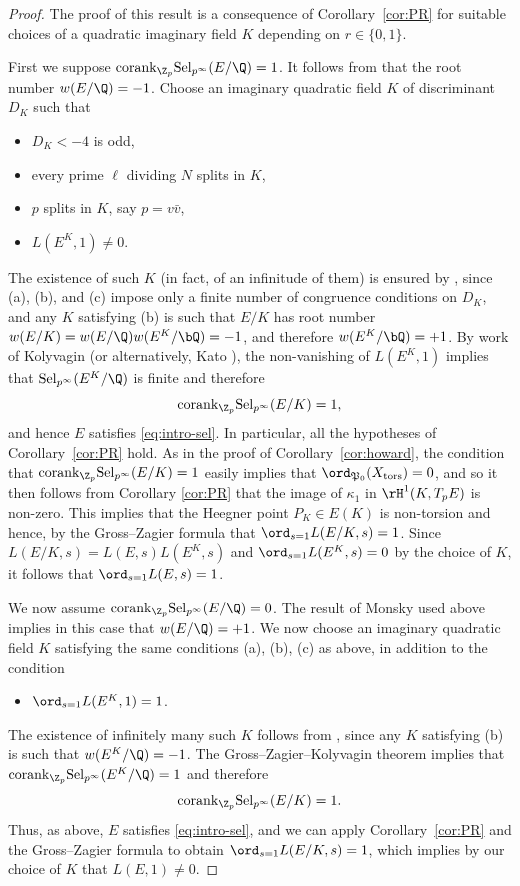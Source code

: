 \begin{proof}
The proof of this result is a consequence of Corollary~\ref{cor:PR} for suitable choices of a quadratic imaginary field $K$ depending on $r\in\{0,1\}$.

First we suppose ${\rm corank}_{\Z_p}{\rm Sel}_{p^\infty}(E/\Q) = 1$. It follows from \cite[Theorem 1.5]{monsky} that the root number $w(E/\Q)=-1$.  Choose an imaginary quadratic field $K$ of discriminant $D_K$ such that
\begin{itemize}
\item[(a)] $D_K<-4$ is odd,
\item[(b)] every prime $\ell$ dividing $N$ splits in $K$,
\item[(c)] $p$ splits in $K$, say $p=v\bar{v}$,
\item[(d)] $L(E^K,1)\neq 0$.
\end{itemize}
The existence of such $K$ (in fact, of an infinitude of them) is ensured by \cite[Thm.~B.1]{twist}, since (a), (b), and (c) impose only a finite number of congruence conditions on $D_K$, and any $K$ satisfying (b) is such that $E/K$ has root number $w(E/K)=w(E/\Q)w(E^K/\bQ)=-1$, and therefore $w(E^K/\bQ)=+1$. By work of Kolyvagin \cite{kolyvagin-mw-sha} (or alternatively, Kato \cite{kato-euler-systems}), the non-vanishing of $L(E^K,1)$ implies that ${\rm Sel}_{p^\infty}(E^K/\Q)$ is finite and therefore
\[
{\rm corank}_{\Z_p}{\rm Sel}_{p^\infty}(E/K) = 1,
\]
and hence $E$ satisfies \eqref{eq:intro-sel}.  In particular, all the hypotheses of Corollary~\ref{cor:PR} hold.
As in the proof of Corollary~\ref{cor:howard}, the condition that ${\rm corank}_{\Z_p}{\rm Sel}_{p^\infty}(E/K) = 1$ easily implies that
$\ord_{\mathfrak{P}_0}(X_{\rm tors}) = 0$, and so it then follows from Corollary \ref{cor:PR} that the image of $\kappa_1$ in
$\rH^1(K,T_pE)$ is non-zero. This implies that the Heegner point $P_K\in E(K)$ is non-torsion and hence, by the Gross--Zagier formula that $\ord_{s=1}L(E/K,s) = 1$. Since $L(E/K,s)= L(E,s)L(E^K,s)$ and $\ord_{s=1}L(E^K,s) = 0$ by the choice of $K$,
it follows that $\ord_{s=1}L(E,s) = 1$.

We now assume ${\rm corank}_{\Z_p}{\rm Sel}_{p^\infty}(E/\Q) = 0$. The result of Monsky used above implies in this case that $w(E/\Q)=+1$. We now choose an imaginary quadratic field $K$ satisfying the same conditions (a), (b), (c) as above, in addition to the condition
\begin{itemize}
\item[(d')] $\ord_{s=1}L(E^K,1)=1$.
\end{itemize}
The existence of infinitely many such $K$ follows from \cite[Thm.~B.2]{twist}, since any $K$ satisfying (b) is such that $w(E^K/\Q)=-1$. The Gross--Zagier--Kolyvagin theorem %
implies that ${\rm corank}_{\Z_p}{\rm Sel}_{p^\infty}(E^K/\Q) = 1$ and therefore
\[
{\rm corank}_{\Z_p}{\rm Sel}_{p^\infty}(E/K) = 1.
\]
Thus, as above, $E$ satisfies \eqref{eq:intro-sel}, and we can apply Corollary~\ref{cor:PR} and the Gross--Zagier formula to obtain $\ord_{s=1}L(E/K,s) = 1$, which implies by our choice of $K$ that $L(E,1)\neq 0$.
\end{proof}


